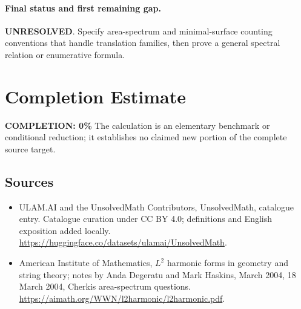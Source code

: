 \documentclass[11pt]{article}
\begin{document}
\paragraph{Final status and first remaining gap.}
\textbf{UNRESOLVED}. Specify area-spectrum and minimal-surface counting conventions that handle translation families, then prove a general spectral relation or enumerative formula.

\section{Completion Estimate}
\noindent\textbf{COMPLETION: 0\%}
The calculation is an elementary benchmark or conditional reduction; it establishes no claimed new portion of the complete source target.

\subsection{Sources}
\begin{itemize}
\item[\hypertarget{source:statement:1}{S1}] ULAM.AI and the UnsolvedMath Contributors, UnsolvedMath, catalogue entry. Catalogue curation under CC BY 4.0; definitions and English exposition added locally.
\url{https://huggingface.co/datasets/ulamai/UnsolvedMath}.
\item[\hypertarget{source:statement:2}{S2}] American Institute of Mathematics, $L^2$ harmonic forms in geometry and string theory; notes by Anda Degeratu and Mark Haskins, March 2004, 18 March 2004, Cherkis area-spectrum questions.
\url{https://aimath.org/WWN/l2harmonic/l2harmonic.pdf}.
\end{itemize}
\label{end:statement}
\end{document}

